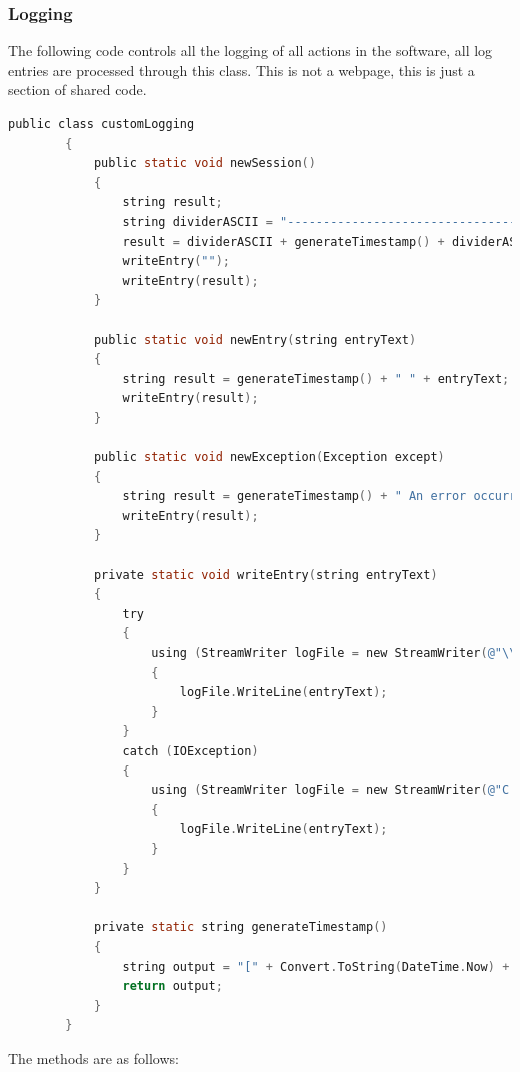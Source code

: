 ﻿\documentclass{article}
\begin{document}
    \subsubsection{Logging}
    The following code controls all the logging of all actions in the software, all log entries are processed through this class.
    This is not a webpage, this is just a section of shared code.
    \begin{lstlisting}[language=C]
        public class customLogging
        {
            public static void newSession()
            {
                string result;
                string dividerASCII = "------------------------------------------";
                result = dividerASCII + generateTimestamp() + dividerASCII;
                writeEntry("");
                writeEntry(result);
            }

            public static void newEntry(string entryText)
            {
                string result = generateTimestamp() + " " + entryText;
                writeEntry(result);
            }

            public static void newException(Exception except)
            {
                string result = generateTimestamp() + " An error occurred in " + except.Source + " with message " + except.Message;
                writeEntry(result);
            }

            private static void writeEntry(string entryText)
            {
                try
                {
                    using (StreamWriter logFile = new StreamWriter(@"\\albert \2011\R04637\Computer Science\coursework\mainCoursework\App_Data\log.txt", true))
                    {
                        logFile.WriteLine(entryText);
                    }
                }
                catch (IOException)
                {
                    using (StreamWriter logFile = new StreamWriter(@"C:\Users\Edward\Source\Repos\coursework\mainCoursework\App_Data\log.txt", true))
                    {
                        logFile.WriteLine(entryText);
                    }
                }
            }

            private static string generateTimestamp()
            {
                string output = "[" + Convert.ToString(DateTime.Now) + "]";
                return output;
            }
        }
    \end{lstlisting}
    The methods are as follows:
\end{document}
